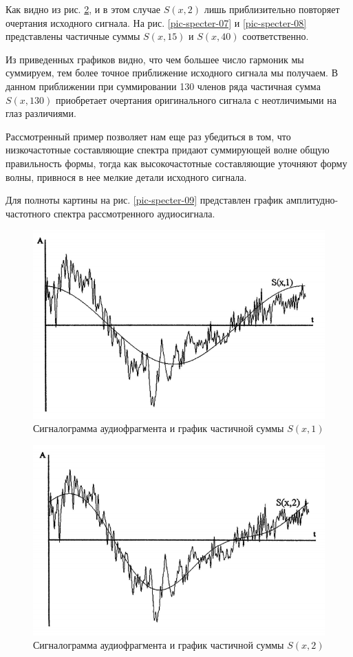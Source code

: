 \documentclass[oneside, final, 14pt]{extreport}
\begin{document}
Как видно из рис. \ref{pic-specter-06}, и в этом случае \(S(x,2)\) лишь приблизительно повторяет очертания исходного сигнала. На рис. \ref{pic-specter-07} и \ref{pic-specter-08} представлены частичные суммы \(S(x,15)\) и \(S(x,40)\) соответственно.

Из приведенных графиков видно, что чем большее число гармоник мы суммируем, тем более точное приближение исходного сигнала мы получаем. В данном приближении при суммировании 130 членов ряда частичная сумма \(S(x,130)\)
приобретает очертания оригинального сигнала с неотличимыми на глаз различиями.

Рассмотренный пример позволяет нам еще раз убедиться в том, что низкочастотные составляющие спектра придают суммирующей волне общую правильность формы, тогда как высокочастотные составляющие уточняют форму
волны, привнося в нее мелкие детали исходного сигнала.

Для полноты картины на рис. \ref{pic-specter-09} представлен график амплитудно-частотного спектра рассмотренного аудиосигнала.

\begin{figure}
\centering
\includegraphics{pic-specter-05}
\caption{Сигналограмма аудиофрагмента и график частичной суммы \(S(x,1)\)}
\label{pic-specter-05}
\end{figure}

\begin{figure}
\centering
\includegraphics{pic-specter-06}
\caption{Сигналограмма аудиофрагмента и график частичной суммы \(S(x,2)\)}
\label{pic-specter-06}
\end{figure}
\end{document}
